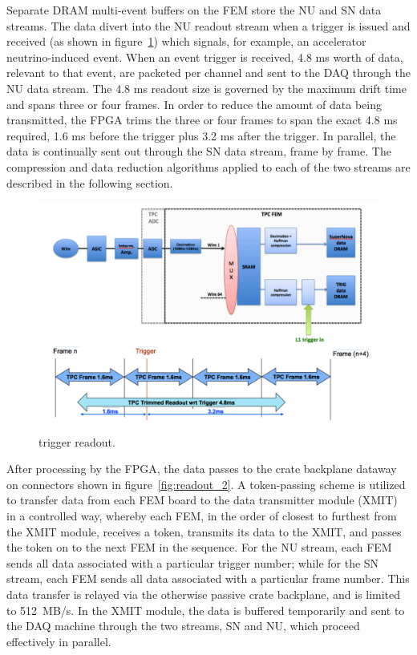 Separate DRAM multi-event buffers on the FEM store the NU and SN data streams. The data divert into the NU readout stream when a trigger is issued and received (as shown in figure~\ref{fig:readout_4}) which signals, for example, an accelerator neutrino-induced event. When an event trigger is received, 4.8 ms worth of data, relevant to that event, are packeted per channel and sent to the DAQ through the NU data stream. The 4.8 ms readout size is governed by the maximum drift time and spans three or four frames. In order to reduce the amount of data being transmitted, the FPGA trims the three or four frames to span the exact 4.8 ms required, 1.6 ms before the trigger plus 3.2 ms after the trigger. In parallel, the data is continually sent out through the SN data stream, frame by frame. The compression and data reduction algorithms applied to each of the two streams are described in the following section.
 
\begin{figure}
\centering
\includegraphics[width=0.8\linewidth]{./figures/readout_4.png}%
\caption{\label{fig:readout_4}\lartpc trigger readout.}
\end{figure}

After processing by the FPGA, the data passes to the crate backplane dataway on connectors shown in figure~\ref{fig:readout_2}. A token-passing scheme is utilized to transfer data from each FEM board to the data transmitter module (XMIT) in a controlled way, whereby each FEM, in the order of closest to furthest from the XMIT module, receives a token, transmits its data to the XMIT, and passes the token on to the next FEM in the sequence. For the NU stream, each FEM sends all data associated with a particular trigger number; while for the SN stream, each FEM sends all data associated with a particular frame number. This data transfer is relayed via the otherwise passive crate backplane, and is limited to 512~MB/s. In the XMIT module, the data is buffered temporarily and sent to the DAQ machine through the two streams, SN and NU, which proceed effectively in parallel.

